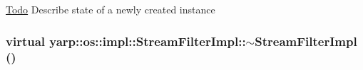 \begin{Desc}
\item[\hyperlink{todo__todo000014}{Todo}]Describe state of a newly created instance \end{Desc}
\hypertarget{classyarp_1_1os_1_1impl_1_1_stream_filter_impl_aa7fa903f6a608c621e892a21f0c0c4eb}{
\subsubsection[{$\sim$StreamFilterImpl}]{\setlength{\rightskip}{0pt plus 5cm}virtual yarp::os::impl::StreamFilterImpl::$\sim$StreamFilterImpl ()}}
\label{classyarp_1_1os_1_1impl_1_1_stream_filter_impl_aa7fa903f6a608c621e892a21f0c0c4eb}



